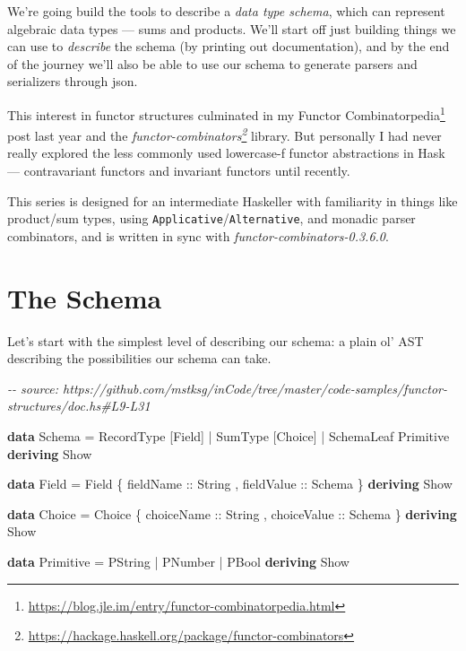 \documentclass[]{article}
\newenvironment{Shaded}{}{}
\newcommand{\CommentTok}[1]{\textcolor[rgb]{0.38,0.63,0.69}{\textit{#1}}}
\newcommand{\DataTypeTok}[1]{\textcolor[rgb]{0.56,0.13,0.00}{#1}}
\newcommand{\KeywordTok}[1]{\textcolor[rgb]{0.00,0.44,0.13}{\textbf{#1}}}
\newcommand{\NormalTok}[1]{#1}
\newcommand{\OperatorTok}[1]{\textcolor[rgb]{0.40,0.40,0.40}{#1}}
\newcommand{\OtherTok}[1]{\textcolor[rgb]{0.00,0.44,0.13}{#1}}
\renewcommand{\href}[2]{#2\footnote{\url{#1}}}
\begin{document}
We're going build the tools to describe a \emph{data type schema}, which can
represent algebraic data types --- sums and products. We'll start off just
building things we can use to \emph{describe} the schema (by printing out
documentation), and by the end of the journey we'll also be able to use our
schema to generate parsers and serializers through json.

This interest in functor structures culminated in my
\href{https://blog.jle.im/entry/functor-combinatorpedia.html}{Functor
Combinatorpedia} post last year and the
\emph{\href{https://hackage.haskell.org/package/functor-combinators}{functor-combinators}}
library. But personally I had never really explored the less commonly used
lowercase-f functor abstractions in Hask --- contravariant functors and
invariant functors until recently.

This series is designed for an intermediate Haskeller with familiarity in things
like product/sum types, using \texttt{Applicative}/\texttt{Alternative}, and
monadic parser combinators, and is written in sync with
\emph{functor-combinators-0.3.6.0}.

\section{The Schema}\label{the-schema}

Let's start with the simplest level of describing our schema: a plain ol' AST
describing the possibilities our schema can take.

\begin{Shaded}
\begin{Highlighting}[]
\CommentTok{{-}{-} source: https://github.com/mstksg/inCode/tree/master/code{-}samples/functor{-}structures/doc.hs\#L9{-}L31}

\KeywordTok{data} \DataTypeTok{Schema} \OtherTok{=}
      \DataTypeTok{RecordType}\NormalTok{  [}\DataTypeTok{Field}\NormalTok{]}
    \OperatorTok{|} \DataTypeTok{SumType}\NormalTok{     [}\DataTypeTok{Choice}\NormalTok{]}
    \OperatorTok{|} \DataTypeTok{SchemaLeaf}  \DataTypeTok{Primitive}
  \KeywordTok{deriving} \DataTypeTok{Show}

\KeywordTok{data} \DataTypeTok{Field} \OtherTok{=} \DataTypeTok{Field}
\NormalTok{    \{}\OtherTok{ fieldName  ::} \DataTypeTok{String}
\NormalTok{    ,}\OtherTok{ fieldValue ::} \DataTypeTok{Schema}
\NormalTok{    \}}
  \KeywordTok{deriving} \DataTypeTok{Show}

\KeywordTok{data} \DataTypeTok{Choice} \OtherTok{=} \DataTypeTok{Choice}
\NormalTok{    \{}\OtherTok{ choiceName  ::} \DataTypeTok{String}
\NormalTok{    ,}\OtherTok{ choiceValue ::} \DataTypeTok{Schema}
\NormalTok{    \}}
  \KeywordTok{deriving} \DataTypeTok{Show}

\KeywordTok{data} \DataTypeTok{Primitive} \OtherTok{=}
      \DataTypeTok{PString}
    \OperatorTok{|} \DataTypeTok{PNumber}
    \OperatorTok{|} \DataTypeTok{PBool}
  \KeywordTok{deriving} \DataTypeTok{Show}
\end{Highlighting}
\end{Shaded}
\end{document}
